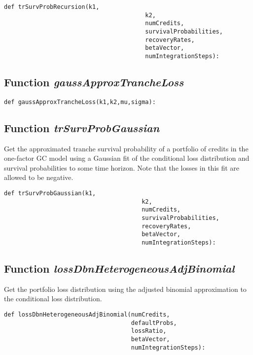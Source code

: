 \documentclass[twoside,11pt]{book}
\begin{document}
\begin{lstlisting}
def trSurvProbRecursion(k1,
                                        k2,
                                        numCredits,
                                        survivalProbabilities,
                                        recoveryRates,
                                        betaVector,
                                        numIntegrationSteps):
\end{lstlisting}

\subsection{Function {\it gaussApproxTrancheLoss}}


\begin{lstlisting}
def gaussApproxTrancheLoss(k1,k2,mu,sigma):
\end{lstlisting}

\subsection{Function {\it trSurvProbGaussian}}
Get the approximated tranche survival probability of a portfolio of credits in the one-factor GC model using a Gaussian fit of the conditional loss distribution and survival probabilities to some time horizon. Note that the losses in this fit are allowed to be negative. 

\begin{lstlisting}
def trSurvProbGaussian(k1,
                                       k2,
                                       numCredits,
                                       survivalProbabilities,
                                       recoveryRates,
                                       betaVector,
                                       numIntegrationSteps):
\end{lstlisting}

\subsection{Function {\it lossDbnHeterogeneousAdjBinomial}}
Get the portfolio loss distribution using the adjusted binomial approximation to the conditional loss distribution. 

\begin{lstlisting}
def lossDbnHeterogeneousAdjBinomial(numCredits, 
                                    defaultProbs, 
                                    lossRatio,
                                    betaVector,
                                    numIntegrationSteps):
\end{lstlisting}
\end{document}
